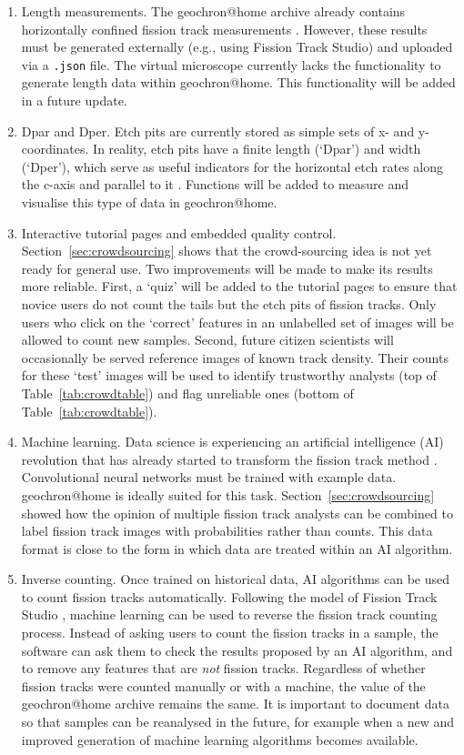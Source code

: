 \documentclass[gchron, manuscript]{copernicus}
\begin{document}
\begin{enumerate}
\item Length measurements. The geochron@home archive already contains
  horizontally confined fission track measurements \citep{tamer2025}.
  However, these results must be generated externally (e.g., using
  Fission Track Studio) and uploaded via a \texttt{.json} file.  The
  virtual microscope currently lacks the functionality to generate
  length data within geochron@home. This functionality will be added
  in a future update.
\item Dpar and Dper. Etch pits are currently stored as simple sets of
  x- and y-coordinates.  In reality, etch pits have a finite length
  (`Dpar') and width (`Dper'), which serve as useful indicators for
  the horizontal etch rates along the c-axis and parallel to it
  \citep{donelick1993}. Functions will be added to measure and
  visualise this type of data in geochron@home.
\item Interactive tutorial pages and embedded quality
  control. Section~\ref{sec:crowdsourcing} shows that the
  crowd-sourcing idea is not yet ready for general use. Two
  improvements will be made to make its results more reliable. First,
  a `quiz' will be added to the tutorial pages to ensure that novice
  users do not count the tails but the etch pits of fission
  tracks. Only users who click on the `correct' features in an
  unlabelled set of images will be allowed to count new
  samples. Second, future citizen scientists will occasionally be
  served reference images of known track density. Their counts for
  these `test' images will be used to identify trustworthy analysts
  (top of Table~\ref{tab:crowdtable}) and flag unreliable ones (bottom
  of Table~\ref{tab:crowdtable}).
\item Machine learning. Data science is experiencing an artificial
  intelligence (AI) revolution that has already started to transform
  the fission track method \citep{nachtergaele2021}.  Convolutional
  neural networks must be trained with example data. geochron@home is
  ideally suited for this task. Section~\ref{sec:crowdsourcing} showed
  how the opinion of multiple fission track analysts can be combined
  to label fission track images with probabilities rather than
  counts. This data format is close to the form in which data are
  treated within an AI algorithm.
\item Inverse counting. Once trained on historical data, AI algorithms
  can be used to count fission tracks automatically. Following the
  model of Fission Track Studio \citep{gleadow2009, gleadow2019},
  machine learning can be used to reverse the fission track counting
  process. Instead of asking users to count the fission tracks in a
  sample, the software can ask them to check the results proposed by
  an AI algorithm, and to remove any features that are \emph{not}
  fission tracks.  Regardless of whether fission tracks were counted
  manually or with a machine, the value of the geochron@home archive
  remains the same. It is important to document data so that samples
  can be reanalysed in the future, for example when a new and improved
  generation of machine learning algorithms becomes available.
\end{enumerate}
\end{document}
